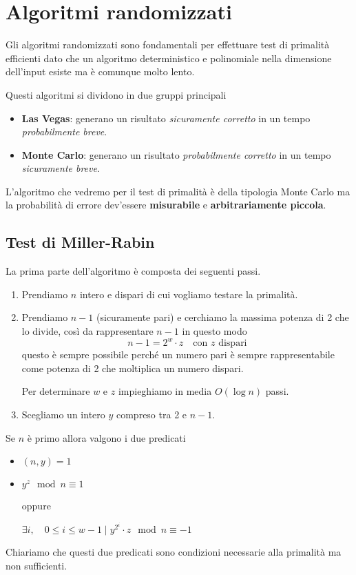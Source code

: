 \section{Algoritmi randomizzati}
Gli algoritmi randomizzati sono fondamentali per effettuare test di primalit\`a efficienti dato che un algoritmo
deterministico e polinomiale nella dimensione dell'input esiste ma \`e comunque molto lento.

Questi algoritmi si dividono in due gruppi principali
\begin{itemize}
	\item \textbf{Las Vegas}: generano un risultato \emph{sicuramente corretto} in un tempo \emph{probabilmente breve}.
	\item \textbf{Monte Carlo}: generano un risultato \emph{probabilmente corretto} in un tempo \emph{sicuramente breve}.
\end{itemize}
L'algoritmo che vedremo per il test di primalit\`a \`e della tipologia Monte Carlo ma la probabilit\`a di errore
dev'essere \textbf{misurabile} e \textbf{arbitrariamente piccola}.

\subsection{Test di Miller-Rabin}
La prima parte dell'algoritmo \`e composta dei seguenti passi.
\begin{enumerate}
	\item Prendiamo $n$ intero e dispari di cui vogliamo testare la primalit\`a.
	\item Prendiamo $n-1$ (sicuramente pari) e cerchiamo la massima potenza di 2 che lo divide, cos\`i da rappresentare
	      $n-1$ in questo modo
	      \[ n-1 = 2^w \cdot z \quad \text{con $z$ dispari} \]
	      questo \`e sempre possibile perch\'e un numero pari \`e sempre rappresentabile come potenza di 2 che moltiplica
	      un numero dispari.

	      Per determinare $w$ e $z$ impieghiamo in media $O(\log n)$ passi.
	\item Scegliamo un intero $y$ compreso tra 2 e $n-1$.
\end{enumerate}
Se $n$ \`e primo allora valgono i due predicati
\begin{itemize}
	\item $(n, y) = 1$
	\item $y^z \mod{n} \equiv 1$

	      oppure

	      $\exists i, \quad 0 \leq i \leq w-1 \mid y^{2^i} \cdot z \mod{n} \equiv -1$
\end{itemize}
Chiariamo che questi due predicati sono condizioni necessarie alla primalit\`a ma non sufficienti.


